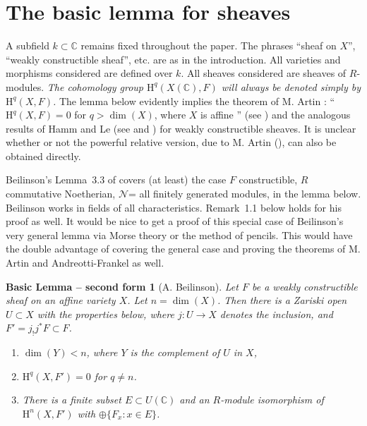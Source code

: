 \documentclass[10pt,twoside]{article}
\newtheorem{bslem}{Basic Lemma -- second form}
\newcommand{\homology}{{\mathrm {H}}}
\newcommand{\C}{{\mathbb {C}}}
\begin{document}
\section{The basic lemma for sheaves}

A subfield $k\subset\C$ remains fixed throughout the paper. The
phrases ``sheaf on $X$'', ``weakly constructible sheaf'', etc. are
as in the introduction. All varieties and morphisms considered
are defined over $k$. All sheaves considered are sheaves 
of $R$-modules. 
\emph{The cohomology group $\homology ^q(X(\C),F)$
will always be denoted simply by $\homology ^q(X,F)$.}
The lemma below evidently implies the theorem of M. Artin
: ``$\homology^q(X,F)=0$ for $q> \dim(X)$, where $X$
 is affine '' (see \cite[Expose~XIV,~Corollary~3.2]{nori:SGA4}) and 
the analogous results of Hamm and Le (see \cite{nori:HL1} and \cite{nori:HL2})
 for weakly constructible sheaves.
It is unclear whether or not the  powerful relative version, 
due to M. Artin (\cite[Thm.~3.1,~Expose XIV]{nori:SGA4}), 
 can also be obtained directly. 

Beilinson's Lemma~3.3 of \cite{nori:Be2}
covers (at least) the case $F$ constructible, $R$ commutative
Noetherian, 
$\mathcal{N}$= all finitely generated modules, in the lemma 
below. Beilinson works in fields of all characteristics.  
Remark~1.1 below holds for his proof as well.
It would be nice to get a proof of 
this special case of Beilinson's very general lemma
 via Morse theory or the method of pencils. 
This would have the double advantage of covering the general case
and proving the theorems of M. Artin and Andreotti-Frankel
as well.


\begin{bslem}[A. Beilinson]
Let $F$ be a weakly constructible 
sheaf on an affine variety $X$. Let $n=\dim (X)$. 
Then there is a Zariski open $U\subset X$ with the properties below,  
where 
$j:U\to X$ denotes the inclusion, and
$F'=j_!j^*F\subset F$. 
\begin{enumerate}
\item[{\rm (1)}] $\dim (Y)<n$, where $Y$ is the complement of $U$ in $X$,
\item[{\rm (2)}] $\homology ^q (X,F')=0$ for $q\neq n$.
\item[{\rm (3)}]  There is a finite subset $E\subset U(\C)$ 
and an $R$-module isomorphism of 
$\homology ^n (X,F')$ with 
$\oplus \{ F_x:x\in E\}$.
\end{enumerate}
\end{bslem}
                
\end{document}
